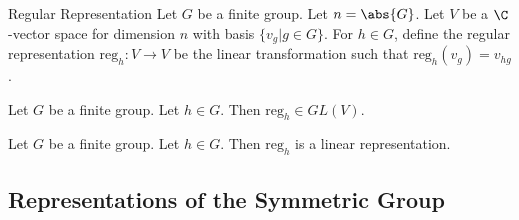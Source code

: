 \documentclass[a4paper]{article}
\begin{document}
\begin{defn}{Regular Representation}{} Let $G$ be a finite group. Let $n=\abs{G}$. Let $V$ be a $\C$-vector space for dimension $n$ with basis $\{v_g|g\in G\}$. For $h\in G$, define the regular representation $\text{reg}_h:V\to V$ be the linear transformation such that $\text{reg}_h(v_g)=v_{hg}$. 
\end{defn}

\begin{lmm}{}{} Let $G$ be a finite group. Let $h\in G$. Then $\text{reg}_h\in GL(V)$. 
\end{lmm}

\begin{lmm}{}{} Let $G$ be a finite group. Let $h\in G$. Then $\text{reg}_h$ is a linear representation. 
\end{lmm}

\subsection{Representations of the Symmetric Group}
\end{document}
